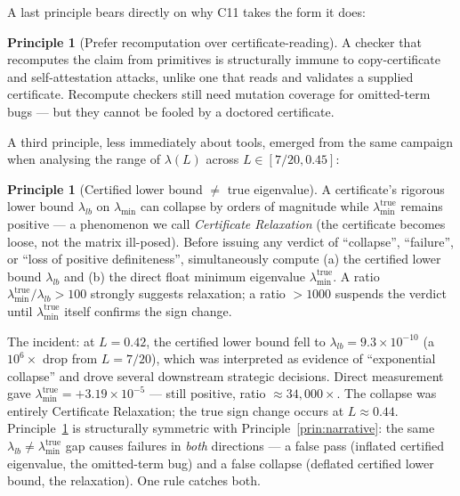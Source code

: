 \documentclass[11pt,a4paper]{amsart}
\theoremstyle{plain}
\theoremstyle{definition}
\newtheorem{principle}[theorem]{Principle}
\newcommand{\CelevenA}{\textsf{C11}}
\begin{document}
A last principle bears directly on why \CelevenA{} takes the form it does:

\begin{principle}[Prefer recomputation over certificate-reading]
A checker that recomputes the claim from primitives is structurally immune to
copy-certificate and self-attestation attacks, unlike one that reads and
validates a supplied certificate. Recompute checkers still need mutation coverage
for omitted-term bugs --- but they cannot be fooled by a doctored certificate.
\end{principle}

A third principle, less immediately about tools, emerged from the same campaign
when analysing the range of $\lambda(L)$ across $L \in [7/20, 0.45]$:

\begin{principle}[Certified lower bound $\neq$ true eigenvalue]
\label{prin:lb-vs-true}
A certificate's rigorous lower bound $\lambda_{lb}$ on $\lambda_{\min}$ can
collapse by orders of magnitude while $\lambda_{\min}^{\mathrm{true}}$ remains
positive --- a phenomenon we call \emph{Certificate Relaxation} (the
certificate becomes loose, not the matrix ill-posed).
Before issuing any verdict of ``collapse'', ``failure'', or ``loss of positive
definiteness'', simultaneously compute (a) the certified lower bound $\lambda_{lb}$
and (b) the direct float minimum eigenvalue $\lambda_{\min}^{\mathrm{true}}$.
A ratio $\lambda_{\min}^{\mathrm{true}}/\lambda_{lb} > 100$ strongly suggests
relaxation; a ratio $> 1000$ suspends the verdict until $\lambda_{\min}^{\mathrm{true}}$
itself confirms the sign change.
\end{principle}

\noindent The incident: at $L=0.42$, the certified lower bound fell to
$\lambda_{lb} = 9.3\times10^{-10}$ (a $10^6\times$ drop from $L=7/20$),
which was interpreted as evidence of ``exponential collapse'' and drove several
downstream strategic decisions.  Direct measurement gave
$\lambda_{\min}^{\mathrm{true}} = +3.19\times10^{-5}$ --- still positive,
ratio $\approx 34{,}000\times$.  The collapse was entirely Certificate
Relaxation; the true sign change occurs at $L \approx 0.44$.
Principle~\ref{prin:lb-vs-true} is structurally symmetric with
Principle~\ref{prin:narrative}: the same $\lambda_{lb} \neq \lambda_{\min}^{\mathrm{true}}$
gap causes failures in \emph{both} directions --- a false pass (inflated certified
eigenvalue, the omitted-term bug) and a false collapse (deflated certified lower
bound, the relaxation). One rule catches both.
\end{document}
